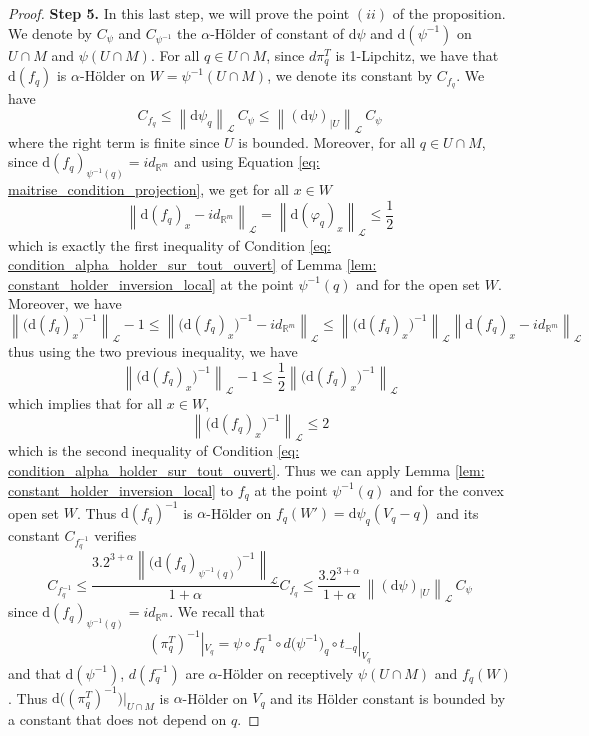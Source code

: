 \documentclass[10pt,a4paper]{amsart}
\newcommand{\R}{\mathbb{R}}
\renewcommand{\d}{\mathrm{d}}
\renewcommand{\leq}{\leqslant}
\newcommand{\opnorm}[1]{{\left\| #1 \right\|}_{\mathcal{L}}}
\begin{document}
\begin{proof}
    
    \noindent \textbf{Step 5.} 
    In this last step, we will prove the point $(ii)$ of the proposition.
    We denote by $C_{\psi}$ and $C_{\psi^{-1}}$ the $\alpha$-Hölder of constant of $\d \psi$ and $\d (\psi^{-1})$ on $U \cap M$ and $\psi(U \cap M)$.
    For all $q \in U \cap M$, since $d \pi_q^T$ is 1-Lipchitz, we have that $\d(f_{q})$ is $\alpha$-Hölder on $W = \psi^{-1}(U \cap M)$, we denote its constant by $C_{f_{q}}$.
    We have 
    \[ C_{f_{q}} \leq \opnorm{\d \psi_{q}} \, C_{\psi} \leq \opnorm{(\d \psi)_{|U}  }\, C_{\psi}\]
    where the right term is finite since $U$ is bounded.
    Moreover, for all $q\in U \cap M$, since $\d (f_{q})_{\psi^{-1}(q)} = id_{\R^m}$ and using Equation \eqref{eq: maitrise_condition_projection}, we get for all $x \in W$
    \[ \opnorm{\d (f_q)_x - id_{\R^m} } = \opnorm{ \d ( \varphi_q)_x } \leq \frac{1}{2}\]
    which is exactly the first inequality of Condition \eqref{eq: condition_alpha_holder_sur_tout_ouvert} of Lemma \ref{lem: constant_holder_inversion_local} at the point $\psi^{-1}(q)$ and for the open set $W$.
    Moreover, we have
    \[ \opnorm{ \big( \d (f_q)_x \big)^{-1} } -1 \leq \opnorm{  \big( \d (f_q)_x \big)^{-1} - id_{\R^m} } \leq \opnorm{ \big( \d (f_q)_x \big)^{-1} }  \opnorm{ \d (f_q)_x - id_{\R^m}  } \]
    thus using the two previous inequality, we have
    \[ \opnorm{ \big( \d (f_q)_x \big)^{-1} } -1 \leq \frac{1}{2} \opnorm{ \big( \d (f_q)_x \big)^{-1} } \]
    which implies that for all $x \in W$,
    \[ \opnorm{ \big( \d (f_q)_x \big)^{-1} } \leq 2\]
    which is the second inequality of Condition \eqref{eq: condition_alpha_holder_sur_tout_ouvert}.
    Thus we can apply Lemma \ref{lem: constant_holder_inversion_local} to $f_{q}$ at the point $\psi^{-1}(q)$ and for the convex open set $W$.
    Thus $\d (f_{q})^{-1}$ is $\alpha$-Hölder on $f_{q}(W') = \d \psi_{q}(V_{q} - q)$ and its constant $C_{f^{-1}_{q}}$ verifies
    \[ C_{f^{-1}_{q}} \leq \frac{3.2^{3+\alpha} \opnorm{ \big(\d (f_{q})_{\psi^{-1}(q)} \big)^{-1} }}{1 + \alpha} C_{f_{q}} \leq \frac{3.2^{3+\alpha}}{1 + \alpha} \, {\opnorm{(\d \psi)_{|U} }} \, C_{\psi}\]
    since $\d (f_{q})_{\psi^{-1}(q)} = id_{\R^m}$.
    We recall that
    $$(\pi_{q}^T)^{-1} |_{V_q} = \psi \circ f_{q}^{-1} \circ d \big(\psi^{-1}\big) _q \circ t_{-q} |_{V_q} $$
    and that $\d (\psi^{-1})$, $d( f_{q}^{-1})$ are $\alpha$-Hölder on receptively $\psi(U \cap M)$ and $f_{q}(W)$.
    Thus $\d \big( (\pi_{q}^T)^{-1} \big) |_{U \cap M}$ is $\alpha$-Hölder on $V_{q}$ and its Hölder constant is bounded by a constant that does not depend on $q$.
\end{proof}
\end{document}
